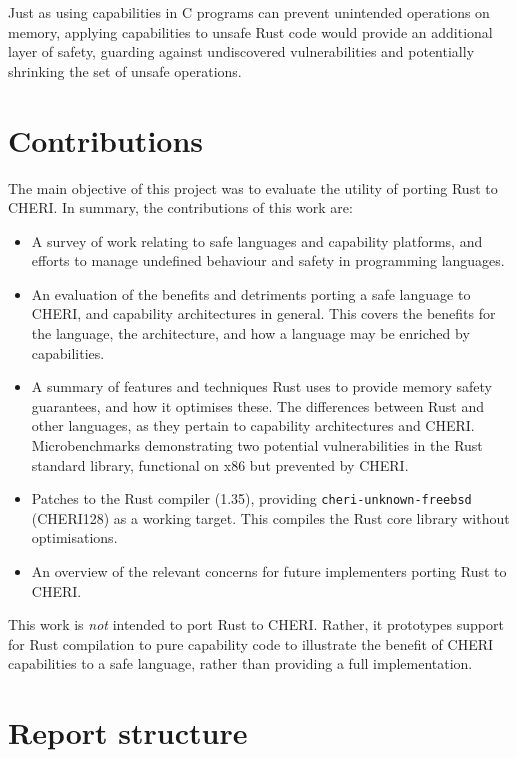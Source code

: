 \documentclass[dissertation.tex]{subfiles}
\begin{document}
Just as using capabilities in C programs can prevent unintended operations on memory, applying capabilities to unsafe Rust code would provide an additional layer of safety, guarding against undiscovered vulnerabilities and potentially shrinking the set of unsafe operations.


\section{Contributions}
\label{sec:intro-contrib}

The main objective of this project was to evaluate the utility of
porting Rust to CHERI.
In summary, the contributions of this work are:


\begin{itemize}
    \item A survey of work relating to safe languages and capability
    platforms, and efforts to manage undefined behaviour and safety in
    programming languages.
    \item An evaluation of the benefits and detriments porting a safe
    language to CHERI, and capability architectures in general.
    This covers the benefits for the language, the architecture, and how
    a language may be enriched by capabilities.
    \item A summary of features and techniques Rust uses to provide
    memory safety guarantees, and how it optimises these.
    The differences between Rust and other languages, as they pertain to
    capability architectures and CHERI.
    Microbenchmarks demonstrating two potential vulnerabilities in
    the Rust standard library, functional on x86 but prevented by CHERI.
    \item Patches to the Rust compiler (1.35), providing
    \texttt{cheri-unknown-freebsd} (CHERI128) as a working target.
    This compiles the Rust core library without optimisations.
    \item An overview of the relevant concerns for future implementers
    porting Rust to CHERI.
\end{itemize}

This work is \emph{not} intended to port Rust to CHERI.
Rather, it prototypes support for Rust compilation to pure capability
 code to illustrate the benefit of CHERI
capabilities to a safe language, rather than providing a full
implementation.


\section{Report structure}
\todo{}
\end{document}
